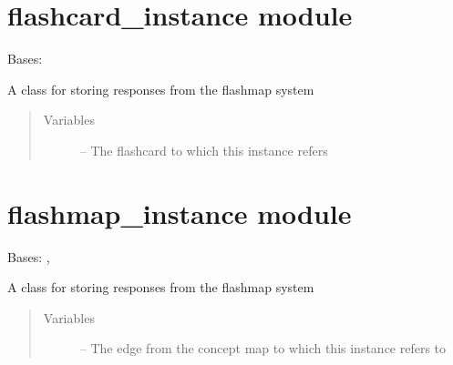 \documentclass[letterpaper,10pt,english]{sphinxmanual}
\begin{document}
\section{flashcard\_instance module}
\label{\detokenize{flashcard_instance:flashcard-instance-module}}\label{\detokenize{flashcard_instance::doc}}\label{\detokenize{flashcard_instance:module-flashcard_instance}}

\begin{fulllineitems}
\label{\detokenize{flashcard_instance:flashcard_instance.FlashcardInstance}}
Bases: {\hyperref[\detokenize{instance:instance.Instance}]{}}

A class for storing responses from the flashmap system
\begin{quote}\begin{description}
\item[{Variables}] \leavevmode
{} -- The flashcard to which this instance refers

\end{description}\end{quote}

\end{fulllineitems}



\section{flashmap\_instance module}
\label{\detokenize{flashmap_instance:flashmap-instance-module}}\label{\detokenize{flashmap_instance::doc}}\label{\detokenize{flashmap_instance:module-flashmap_instance}}

\begin{fulllineitems}
\label{\detokenize{flashmap_instance:flashmap_instance.FlashmapInstance}}
Bases: {\hyperref[\detokenize{instance:instance.Instance}]{}}, 

A class for storing responses from the flashmap system
\begin{quote}\begin{description}
\item[{Variables}] \leavevmode
{} -- The edge from the concept map to which this instance refers to

\end{description}\end{quote}

\end{fulllineitems}
\end{document}
